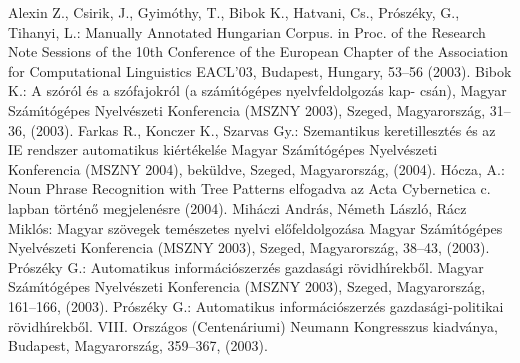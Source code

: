 \documentclass{llncs}
\begin{document}
%
%
\begin{thebibliography}{15}
%
Alexin Z., Csirik, J., Gyim\'othy, T., Bibok K., Hatvani, Cs.,
Pr\'osz\'eky, G., Tihanyi, L.:
Manually Annotated Hungarian Corpus.
in Proc. of the Research Note Sessions of the 10th Conference
of the European Chapter of the Association for Computational
Linguistics EACL'03, Budapest, Hungary, 53--56 (2003).
%
Bibok K.:
A sz\'or\'ol \'es a sz\'ofajokr\'ol (a sz\'am\'\i t\'og\'epes nyelvfeldolgoz\'as kap- cs\'an),
Magyar Sz\'am\'\i t\'og\'epes Nyelv\'eszeti Konferencia (MSZNY 2003),
Szeged, Magyarorsz\'ag, 31--36, (2003).
%
Farkas R., Konczer K., Szarvas Gy.:
Szemantikus keretilleszt\'es \'es az IE rendszer automatikus ki\'ert\'ekel\'se
Magyar Sz\'am\'\i t\'og\'epes Nyelv\'eszeti Konferencia (MSZNY 2004),
bek\"uldve, Szeged, Magyarorsz\'ag, (2004).
%
H\'ocza, A.:
Noun Phrase Recognition with Tree Patterns
elfogadva az Acta Cybernetica c. lapban t\"ort\'en\H{o} megjelen\'esre (2004).
%
Mih\'aczi Andr\'as, N\'emeth L\'aszl\'o, R\'acz Mikl\'os:
Magyar sz\"ovegek tem\'eszetes nyelvi el\H{o}feldolgoz\'asa
Magyar Sz\'am\'\i t\'og\'epes Nyelv\'eszeti Konferencia (MSZNY 2003),
Szeged, Magyarorsz\'ag, 38--43, (2003).
%
Pr\'osz\'eky G.:
Automatikus inform\'aci\'oszerz\'es gazdas\'agi r\"ovidh\'\i rekb\H{o}l.
Magyar Sz\'am\'\i t\'og\'epes Nyelv\'eszeti Konferencia (MSZNY 2003),
Szeged, Magyarorsz\'ag, 161--166, (2003).
%
Pr\'osz\'eky G.:
Automatikus inform\'aci\'oszerz\'es gazdas\'agi-politikai r\"ovidh\'\i rekb\H{o}l.
VIII. Orsz\'agos (Centen\'ariumi) Neumann Kongresszus kiadv\'anya,
Budapest, Magyarorsz\'ag, 359--367, (2003).
%
\end{thebibliography}
\end{document}

